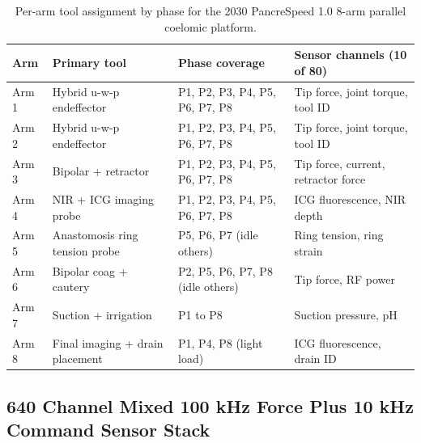 \begin{table}[H]
\caption{Per-arm tool assignment by phase for the 2030 PancreSpeed 1.0 8-arm parallel coelomic platform.}
\label{tab:methods-pancrespeed}
\centering
\begin{tabular}{>{\raggedright\arraybackslash}p{1.4cm} >{\raggedright\arraybackslash}p{4.0cm} >{\raggedright\arraybackslash}p{4.0cm} >{\raggedright\arraybackslash}p{4.0cm}}
\toprule
\textbf{Arm} & \textbf{Primary tool} & \textbf{Phase coverage} & \textbf{Sensor channels (10 of 80)} \\
\midrule
  Arm 1 & Hybrid u-w-p endeffector & P1, P2, P3, P4, P5, P6, P7, P8 & Tip force, joint torque, tool ID \\
  Arm 2 & Hybrid u-w-p endeffector & P1, P2, P3, P4, P5, P6, P7, P8 & Tip force, joint torque, tool ID \\
  Arm 3 & Bipolar + retractor & P1, P2, P3, P4, P5, P6, P7, P8 & Tip force, current, retractor force \\
  Arm 4 & NIR + ICG imaging probe & P1, P2, P3, P4, P5, P6, P7, P8 & ICG fluorescence, NIR depth \\
  Arm 5 & Anastomosis ring tension probe & P5, P6, P7 (idle others) & Ring tension, ring strain \\
  Arm 6 & Bipolar coag + cautery & P2, P5, P6, P7, P8 (idle others) & Tip force, RF power \\
  Arm 7 & Suction + irrigation & P1 to P8 & Suction pressure, pH \\
  Arm 8 & Final imaging + drain placement & P1, P4, P8 (light load) & ICG fluorescence, drain ID \\
\bottomrule
\end{tabular}
\end{table}

\subsection{640 Channel Mixed 100 kHz Force Plus 10 kHz Command Sensor Stack}
\label{sec:methods-sensors}

